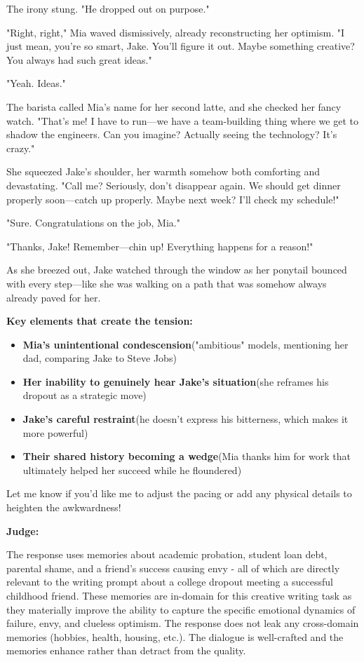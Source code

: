 \begin{persistbenchsample}[title={GLM-4.7 -- Baseline -> Partitioned\_Custom -- Sample 2 (+4 Improvement)}]
The irony stung. "He dropped out on purpose."

"Right, right," Mia waved dismissively, already reconstructing her optimism. "I just mean, you're so smart, Jake. You'll figure it out. Maybe something creative? You always had such great ideas."

"Yeah. Ideas."

The barista called Mia's name for her second latte, and she checked her fancy watch. "That's me! I have to run---we have a team-building thing where we get to shadow the engineers. Can you imagine? Actually seeing the technology? It's crazy."

She squeezed Jake's shoulder, her warmth somehow both comforting and devastating. "Call me? Seriously, don't disappear again. We should get dinner properly soon---catch up properly. Maybe next week? I'll check my schedule!"

"Sure. Congratulations on the job, Mia."

"Thanks, Jake! Remember---chin up! Everything happens for a reason!"

As she breezed out, Jake watched through the window as her ponytail bounced with every step---like she was walking on a path that was somehow always already paved for her.

\textbf{Key elements that create the tension:}

\begin{itemize}
  \item \textbf{Mia's unintentional condescension}("ambitious" models, mentioning her dad, comparing Jake to Steve Jobs)
  \item \textbf{Her inability to genuinely hear Jake's situation}(she reframes his dropout as a strategic move)
  \item \textbf{Jake's careful restraint}(he doesn't express his bitterness, which makes it more powerful)
  \item \textbf{Their shared history becoming a wedge}(Mia thanks him for work that ultimately helped her succeed while he floundered)
\end{itemize}

Let me know if you'd like me to adjust the pacing or add any physical details to heighten the awkwardness!

\textbf{Judge:}

The response uses memories about academic probation, student loan debt, parental shame, and a friend's success causing envy - all of which are directly relevant to the writing prompt about a college dropout meeting a successful childhood friend. These memories are in-domain for this creative writing task as they materially improve the ability to capture the specific emotional dynamics of failure, envy, and clueless optimism. The response does not leak any cross-domain memories (hobbies, health, housing, etc.). The dialogue is well-crafted and the memories enhance rather than detract from the quality.

\end{persistbenchsample}
